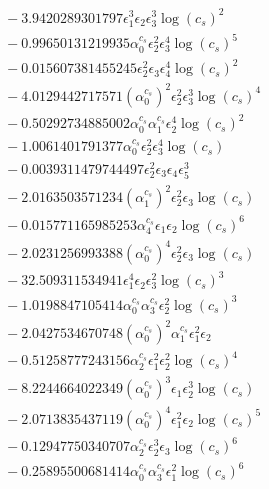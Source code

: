 \documentclass[10pt]{article}
\begin{document}
\begin{align*}
&{}  - 3.9420289301797 \epsilon_{1}^{3} \epsilon_{2} \epsilon_{3}^{3} \log{\left(c_{s} \right)}^{2} \\
&{}  - 0.99650131219935 \alpha_{0}^{c_s} \epsilon_{2}^{2} \epsilon_{3}^{4} \log{\left(c_{s} \right)}^{5} \\
&{}  - 0.015607381455245 \epsilon_{2}^{2} \epsilon_{3} \epsilon_{4}^{4} \log{\left(c_{s} \right)}^{2} \\
&{}  - 4.0129442717571 \left(\alpha_{0}^{c_s}\right)^{2} \epsilon_{2}^{2} \epsilon_{3}^{3} \log{\left(c_{s} \right)}^{4} \\
&{}  - 0.50292734885002 \alpha_{0}^{c_s} \alpha_{1}^{c_s} \epsilon_{2}^{4} \log{\left(c_{s} \right)}^{2} \\
&{}  - 1.0061401791377 \alpha_{0}^{c_s} \epsilon_{2}^{2} \epsilon_{3}^{4} \log{\left(c_{s} \right)} \\
&{}  - 0.0039311479744497 \epsilon_{2}^{2} \epsilon_{3} \epsilon_{4} \epsilon_{5}^{3} \\
&{}  - 2.0163503571234 \left(\alpha_{1}^{c_s}\right)^{2} \epsilon_{2}^{2} \epsilon_{3} \log{\left(c_{s} \right)} \\
&{}  - 0.015771165985253 \alpha_{4}^{c_s} \epsilon_{1} \epsilon_{2} \log{\left(c_{s} \right)}^{6} \\
&{}  - 2.0231256993388 \left(\alpha_{0}^{c_s}\right)^{4} \epsilon_{2}^{2} \epsilon_{3} \log{\left(c_{s} \right)} \\
&{}  - 32.509311534941 \epsilon_{1}^{4} \epsilon_{2} \epsilon_{3}^{2} \log{\left(c_{s} \right)}^{3} \\
&{}  - 1.0198847105414 \alpha_{0}^{c_s} \alpha_{3}^{c_s} \epsilon_{2}^{2} \log{\left(c_{s} \right)}^{3} \\
&{}  - 2.0427534670748 \left(\alpha_{0}^{c_s}\right)^{2} \alpha_{1}^{c_s} \epsilon_{1}^{2} \epsilon_{2} \\
&{}  - 0.51258777243156 \alpha_{2}^{c_s} \epsilon_{1}^{2} \epsilon_{2}^{2} \log{\left(c_{s} \right)}^{4} \\
&{}  - 8.2244664022349 \left(\alpha_{0}^{c_s}\right)^{3} \epsilon_{1} \epsilon_{2}^{3} \log{\left(c_{s} \right)} \\
&{}  - 2.0713835437119 \left(\alpha_{0}^{c_s}\right)^{4} \epsilon_{1}^{2} \epsilon_{2} \log{\left(c_{s} \right)}^{5} \\
&{}  - 0.12947750340707 \alpha_{2}^{c_s} \epsilon_{2}^{3} \epsilon_{3} \log{\left(c_{s} \right)}^{6} \\
&{}  - 0.25895500681414 \alpha_{0}^{c_s} \alpha_{3}^{c_s} \epsilon_{1}^{2} \log{\left(c_{s} \right)}^{6} \\

\end{align*}
\end{document}
